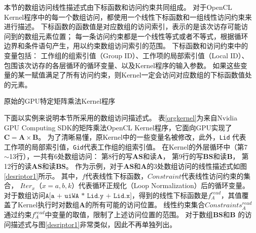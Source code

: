 本节的数组访问线性描述式由下标函数和访问约束共同组成。
对于OpenCL Kernel程序中的每一个数组访问，都使用一个线性下标函数和一组线性访问约束来进行描述。
下标函数的函数值是对应数组的访问索引，表示的是该次访存可能访问到的数组元素位置；
每一条访问约束都是一个线性等式或者不等式，根据循环边界和条件语句产生，用以约束数组访问索引的范围。
下标函数和访问约束中的变量包括：
工作组的组索引值（Group ID）、工作项的局部索引值（Local ID）、包围该次访存的各层循环的循环变量、以及Kernel程序的输入参数。
如果这些变量的某一赋值满足了所有访问约束，则Kernel一定会访问对应数组的下标函数值处的元素。

\begin{table}[htb]
	\centering
	\caption{原始的GPU特定矩阵乘法Kernel程序}
	\label{orgkernel}
\end{table}

下面以实例来说明本节所采用的数组访问描述式。
表\ref{orgkernel}为来自Nvidia GPU Computing SDK的矩阵乘法OpenCL Kernel程序，它面向GPU实现了$\bm{C}=\bm{A}\times \bm{B}$。
为了清晰易懂，原Kernel中的一些变量名被修改，此外，{\tt Lid} 代表工作项的局部索引值，{\tt Gid}代表工作组的组索引值。
在Kernel的外层循环中（第7$\sim$13行），一共有6处数组访问：
第8行的写$\bm{AS}$和读$\bm{A}$，
第9行的写$\bm{BS}$和读$\bm{B}$，
第12行的读$\bm{AS}$和读$\bm{BS}$。
作为示例，对于$\bm{AS}$和$\bm{A}$的3处数组访问的线性描述式如图\ref{desriptor1}所示。
其中，$f$代表线性下标函数，$Constraint$代表线性访问约束的集合，
$Iter_x$（$x = a, b, k$）代表循环正规化（Loop Normalization）后的循环变量。
对于数组访问$\texttt{A[a + uiWA * Lid.y + Lid.x]}$，得到的线性下标函数是$f^{read}_{A}$，其值覆盖了Kernel执行时对数组$\bm{A}$的所有可能的访问位置。
线性约束集合$Constraints^{read}_{A}$通过约束$f^{read}_{A}$中变量的取值，限制了上述访问位置的范围。
对于数组$\bm{BS}$和$\bm{B}$ 的访问描述式与图\ref{desriptor1}非常类似，因此不再单独列出。

